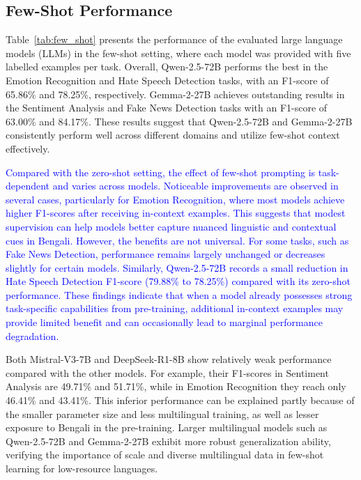 \documentclass[10pt,letterpaper]{article}
\newcommand{\rev}[1]{\textcolor{blue}{#1}}
\begin{document}
\subsection*{Few-Shot Performance}
\label{sec:few_shot}


Table~\ref{tab:few_shot} presents the performance of the evaluated large language models (LLMs) in the few-shot setting, where each model was provided with five labelled examples per task. Overall, Qwen-2.5-72B performs the best in the Emotion Recognition and Hate Speech Detection tasks, with an F1-score of 65.86\% and 78.25\%, respectively. Gemma-2-27B achieves outstanding results in the Sentiment Analysis and Fake News Detection tasks with an F1-score of 63.00\% and 84.17\%. These results suggest that Qwen-2.5-72B and Gemma-2-27B consistently perform well across different domains and utilize few-shot context effectively.

\rev{Compared with the zero-shot setting, the effect of few-shot prompting is task-dependent and varies across models. Noticeable improvements are observed in several cases, particularly for Emotion Recognition, where most models achieve higher F1-scores after receiving in-context examples. This suggests that modest supervision can help models better capture nuanced linguistic and contextual cues in Bengali. However, the benefits are not universal. For some tasks, such as Fake News Detection, performance remains largely unchanged or decreases slightly for certain models. Similarly, Qwen-2.5-72B records a small reduction in Hate Speech Detection F1-score (79.88\% to 78.25\%) compared with its zero-shot performance. These findings indicate that when a model already possesses strong task-specific capabilities from pre-training, additional in-context examples may provide limited benefit and can occasionally lead to marginal performance degradation.}

Both Mistral-V3-7B and DeepSeek-R1-8B show relatively weak performance compared with the other models. For example, their F1-scores in Sentiment Analysis are 49.71\% and 51.71\%, while in Emotion Recognition they reach only 46.41\% and 43.41\%. This inferior performance can be explained partly because of the smaller parameter size and less multilingual training, as well as lesser exposure to Bengali in the pre-training. Larger multilingual models such as Qwen-2.5-72B and Gemma-2-27B exhibit more robust generalization ability, verifying the importance of scale and diverse multilingual data in few-shot learning for low-resource languages.
\end{document}
